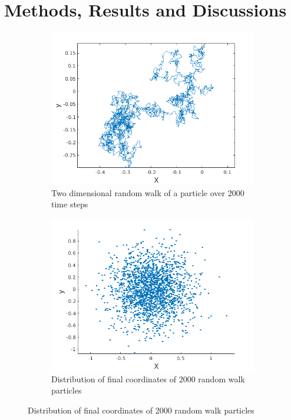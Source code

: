\documentclass[a4paper]{article}
\begin{document}
		\section{Methods, Results and Discussions} \label{1:methods_results}
		
		\begin{figure} [h]
			\begin{subfigure} {.475\columnwidth}
				\includegraphics[width=\columnwidth]{../plots/1aa_randomwalk.png}
				\caption{Two dimensional random walk of a particle over 2000 time steps}
				\label{fig:1a}
			\end{subfigure}%
			\hfill
			\begin{subfigure} {.475\columnwidth}
				\includegraphics[width=\columnwidth]{../plots/1ab_randomwalk.png}
				\caption{Distribution of final coordinates of 2000 random walk particles}
				\label{fig:1b}
			\end{subfigure}
			

\end{figure}
\end{document}
